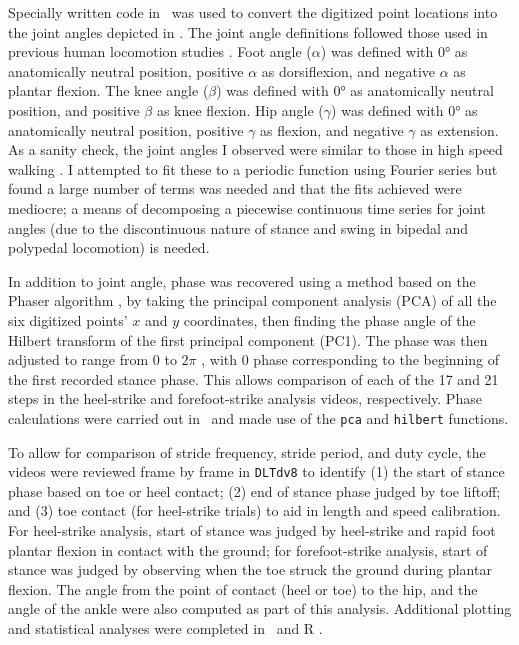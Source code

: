 Specially written code in \Matlab\ was used to convert the digitized point locations into the joint angles depicted in . The joint angle definitions followed those used in previous human locomotion studies \citep{qiao2016leg, giandolini2013impact, larson2014comparison, hamner2010muscle, liu2008muscle, dickinson1985measurement, mcmahon1984muscles}. Foot angle ($\alpha$) was defined with \ang{0} as anatomically neutral position, positive $\alpha$ as dorsiflexion, and negative $\alpha$ as plantar flexion. The knee angle ($\beta$) was defined with \ang{0} as anatomically neutral position, and positive $\beta$ as knee flexion. Hip angle ($\gamma$) was defined with \ang{0} as anatomically neutral position, positive $\gamma$ as flexion, and negative $\gamma$ as extension. As a sanity check, the joint angles I observed were similar to those in high speed walking \citep{liu2008muscle}. I attempted to fit these to a periodic function using Fourier series but found a large number of terms was needed and that the fits achieved were mediocre; a means of decomposing a piecewise continuous time series for joint angles (due to the discontinuous nature of stance and swing in bipedal and polypedal locomotion) is needed. 

In addition to joint angle, phase was recovered using a method based on the Phaser algorithm \citep{revzen2008estimating}, by taking the principal component analysis (PCA) of all the six digitized points' $x$ and $y$ coordinates, then finding the phase angle of the Hilbert transform of the first principal component (PC1). The phase was then adjusted to range from 0 to $2\pi$ \citep{revzen2009towards}, with 0 phase corresponding to the beginning of the first recorded stance phase. This allows comparison of each of the 17 and 21 steps in the heel-strike and forefoot-strike analysis videos, respectively. Phase calculations were carried out in \Matlab\ and made use of the \lstinline{pca} and \lstinline{hilbert} functions. 

To allow for comparison of stride frequency, stride period, and duty cycle, the videos were reviewed frame by frame in \lstinline{DLTdv8} to identify (1) the start of stance phase based on toe or heel contact; (2) end of stance phase judged by toe liftoff; and (3) toe contact (for heel-strike trials) to aid in length and speed calibration.  For heel-strike analysis, start of stance was judged by heel-strike and rapid foot plantar flexion in contact with the ground; for forefoot-strike analysis, start of stance was judged by observing when the toe struck the ground during plantar flexion. The angle from the point of contact (heel or toe) to the hip, and the angle of the ankle were also computed as part of this analysis. Additional plotting and statistical analyses were completed in \Matlab\ and R \citep{r2020}. 

